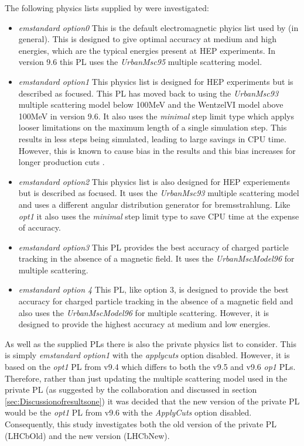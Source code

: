 The following physics lists supplied by \geant were investigated:
\begin{itemize}
\item \textit{emstandard option0}
  This is the default electromagnetic phyics list used by \geant (in general).  This is designed to give optimal accuracy at medium and high energies, which are the typical energies present at HEP experiments.  In version 9.6 this PL uses the \textit{UrbanMsc95} multiple scattering model.
\item \textit{emstandard option1}
  This physics list is designed for HEP experiments but is described as \cms focused. This PL has moved back to using the \textit{UrbanMsc93} multiple scattering model below 100MeV and the WentzelVI model above 100MeV in version 9.6.  It also uses the \textit{minimal} step limit type which applys looser limitations on the maximum length of a single simulation step.  This results in less steps being simulated, leading to large savings in CPU time.  However, this is known to cause bias in the results and this bias increases for longer production cuts \cite{1742-6596-219-3-032045}.
\item \textit{emstandard option2}
  This physics list is also designed for HEP experiements but is described as \lhcb focused.  It uses the \textit{UrbanMsc93} multiple scattering model and uses a different angular distribution generator for bremsstrahlung.  Like \textit{opt1} it also uses the \textit{minimal} step limit type to save CPU time at the expense of accuracy.
\item \textit{emstandard option3}
  This PL provides the best accuracy of charged particle tracking in the absence of a magnetic field.  It uses the \textit{UrbanMscModel96} for multiple scattering.
\item \textit{emstandard option 4}
  This PL, like option 3, is designed to provide the best accuracy for charged particle tracking in the absence of a magnetic field and also uses the \textit{UrbanMscModel96} for multiple scattering.  However, it is designed to provide the highest accuracy at medium and low energies.
\end{itemize}

As well as the \geant supplied PLs there is also the \lhcb private physics list to consider.  This is simply \textit{emstandard option1} with the \textit{applycuts} option disabled.  However, it is based on the \textit{opt1} PL from \geant v9.4 which differs to both the v9.5 and v9.6 \textit{op1} PLs.  Therefore, rather than just updating the multiple scattering model used in the \lhcb private PL (as suggested by the \geant collaboration  and discussed in section \ref{sec:Discussionofresultsone}) it was decided that the new version of the \lhcb private PL would be the \textit{opt1} PL from v9.6 with the \textit{ApplyCuts} option disabled. Consequently, this study investigates both the old version of the \lhcb private PL (LHCbOld) and the new version (LHCbNew).

